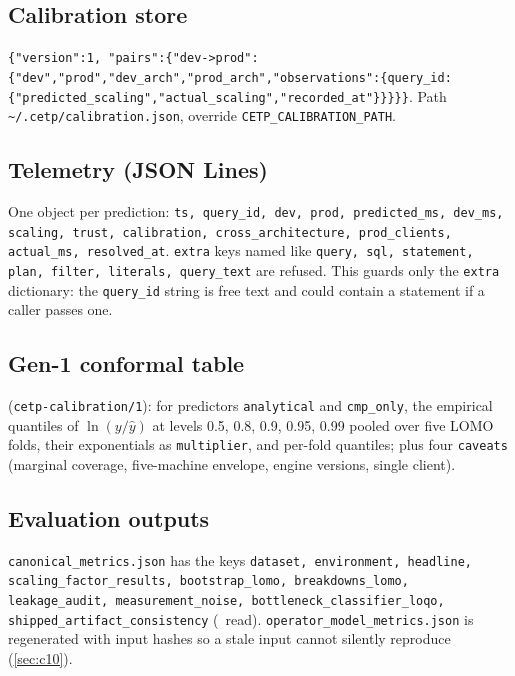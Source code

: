 \subsection{Calibration store}
\texttt{\{"version":1, "pairs":\{"dev->prod":\{"dev","prod","dev\_arch","prod\_arch","observations":\{query\_id:\{"predicted\_scaling","actual\_scaling","recorded\_at"\}\}\}\}\}}.
Path \texttt{\textasciitilde/.cetp/calibration.json}, override \texttt{CETP\_CALIBRATION\_PATH}.

\subsection{Telemetry (JSON Lines)}
One object per prediction: \texttt{ts, query\_id, dev, prod, predicted\_ms, dev\_ms, scaling, trust, calibration, cross\_architecture, prod\_clients, actual\_ms, resolved\_at}.
\texttt{extra} keys named like \texttt{query, sql, statement, plan, filter, literals, query\_text} are refused. This guards only the \texttt{extra} dictionary: the
\texttt{query\_id} string is free text and could contain a statement if a caller passes one.

\subsection{Gen-1 conformal table}
 (\texttt{cetp-calibration/1}): for predictors \texttt{analytical} and \texttt{cmp\_only}, the empirical quantiles of
$\ln(y/\hat y)$ at levels 0.5, 0.8, 0.9, 0.95, 0.99 pooled over five LOMO folds, their exponentials as \texttt{multiplier}, and per-fold quantiles; plus four
\texttt{caveats} (marginal coverage, five-machine envelope, engine versions, single client).

\subsection{Evaluation outputs}
\texttt{canonical\_metrics.json} has the keys \texttt{dataset, environment, headline, scaling\_factor\_results, bootstrap\_lomo, breakdowns\_lomo,
leakage\_audit, measurement\_noise, bottleneck\_classifier\_loqo, shipped\_artifact\_consistency} (\evRUN\ read). \texttt{operator\_model\_metrics.json} is regenerated with
input hashes so a stale input cannot silently reproduce (\cref{sec:c10}).

